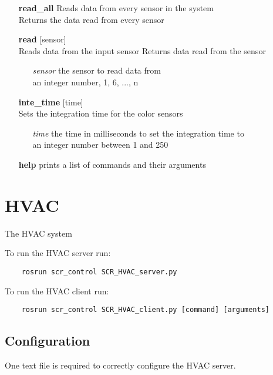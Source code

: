 \documentclass[twoside]{article}
\begin{document}
	\begin{enumerate}
		\item[\bf read\_all] Reads data from every sensor in the system\\
		Returns the data read from every sensor
		\item[\bf read] [sensor]\\
		Reads data from the input sensor
		Returns data read from the sensor
	
		\begin{enumerate}[leftmargin=3\parindent]
			\item[\it sensor] the sensor to read data from\\
			an integer number, 1, 6, ..., n
		\end{enumerate}
	
	\item[\bf inte\_time] [time]\\
	Sets the integration time for the color sensors
	
	\begin{enumerate}[leftmargin=3\parindent]
		\item[\it time] the time in milliseconds to set the integration time to\\
		an integer number between 1 and 250
	\end{enumerate}
	
		\item[\bf help] prints a list of commands and their arguments
	\end{enumerate}
	
	\section{HVAC}
	The HVAC system 

	To run the HVAC server run:
	\begin{verbatim}
	rosrun scr_control SCR_HVAC_server.py
	\end{verbatim}
	
	To run the HVAC client run:
	\begin{verbatim}
	rosrun scr_control SCR_HVAC_client.py [command] [arguments]
	\end{verbatim}
	
	\subsection{Configuration}
	One text file is required to correctly configure the HVAC server.
	
\end{document}
